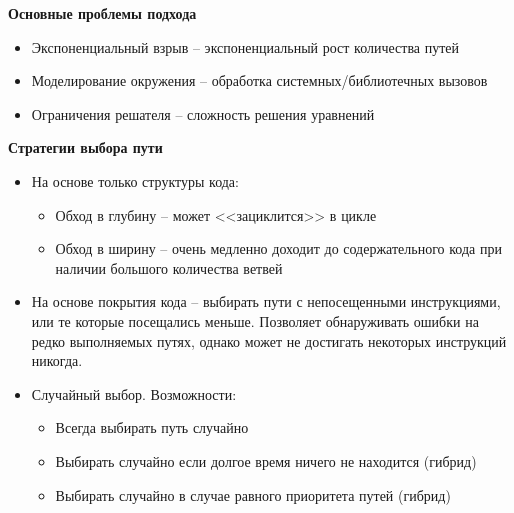 \textbf{Основные проблемы подхода}
\begin{itemize}
    \item Экспоненциальный взрыв – экспоненциальный рост количества путей
    \item Моделирование окружения – обработка системных/библиотечных вызовов
    \item Ограничения решателя – сложность решения уравнений
\end{itemize}

\textbf{Стратегии выбора пути}
\begin{itemize}
    \item На основе только структуры кода:
    \begin{itemize}
        \item Обход в глубину – может <<зациклится>> в цикле
        \item Обход в ширину – очень медленно доходит до содержательного кода при наличии большого количества ветвей
    \end{itemize}
    \item  На основе покрытия кода – выбирать пути с непосещенными инструкциями, или те которые посещались меньше. Позволяет обнаруживать ошибки на редко выполняемых путях, однако может не достигать некоторых инструкций никогда.
    \item Случайный выбор. Возможности:
    \begin{itemize}
        \item Всегда выбирать путь случайно
        \item Выбирать случайно если долгое время ничего не находится (гибрид)
        \item  Выбирать случайно в случае равного приоритета путей (гибрид)
    \end{itemize}
\end{itemize}